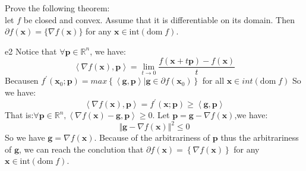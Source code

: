 \documentclass{article}
\newcommand{\xB}{\bm{x}}
\newcommand{\domf}{\textrm{dom}\;f}
\begin{document}
\begin{excercise}\label{e2}
Prove the following theorem: \\
let $f$ be closed and convex. Assume that it is differentiable on its domain. Then 
$\partial f(\xB) = \{ \nabla  f(\xB) \}$
for any $\xB \in \textrm{int}(\domf)$.
\end{excercise}

\begin{PROOF}{e2}
Notice that $\forall \bm{p} \in \mathbb{R} ^n$, we have:
\begin{equation}
	\left\langle \nabla f(\xB),\bm{p}\right\rangle = \lim_{t\rightarrow 0} \frac{f(\xB+t\bm{p})-f(\xB)}{t}
\end{equation}
Becausen $f^{'}(\bm{x}_0;\bm{p})=max\left\{\left\langle\bm{g},\bm{p}\right\rangle|\bm{g}\in\partial f(\bm{x}_0)\right\}$ for all $\bm{x}\in int(\domf)$
So we have:
\begin{equation}
	\left\langle \nabla f(\xB),\bm{p}\right\rangle = f^{'}(\bm{x};\bm{p})\ge \left\langle\bm{g},\bm{p}\right\rangle
\end{equation}
That is:$\forall \bm{p}\in\mathbb{R}^n,\left\langle\nabla f(\bm{x})-\bm{g},\bm{p}\right\rangle\ge 0$.
Let $\bm{p}=\bm{g}-\nabla f(\bm{x})$,we have:
\begin{equation}
	\Vert\bm{g}-\nabla f(\bm{x})\Vert^2\le 0
\end{equation}
So we have $\bm{g}=\nabla f(\bm{x})$.
Because of the arbitrariness of $\bm{p}$ thus the arbitrariness of $\bm{g}$, we can reach the conclution that $\partial f(\bm{x})=\left\{\nabla f(\bm{x})\right\}$ for any $\xB \in \textrm{int}(\domf)$.

\end{PROOF}
\end{document}
